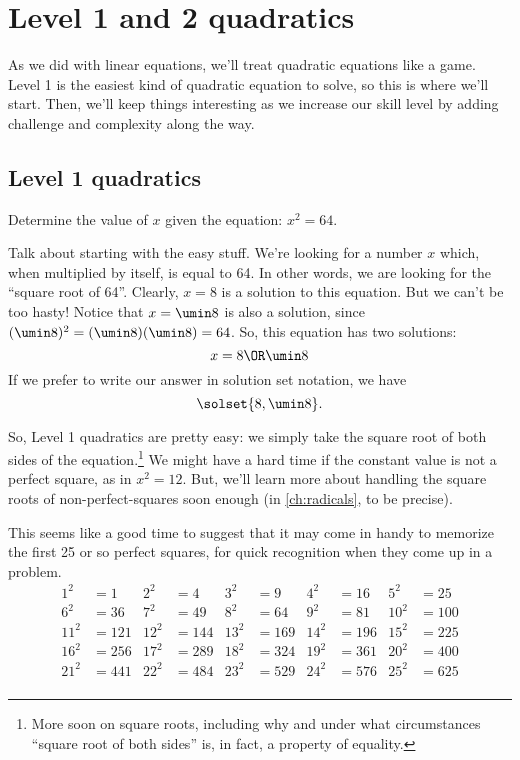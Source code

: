 \section{Level 1 and 2 quadratics}

As we did with linear equations, we'll treat quadratic equations like a game. Level 1 is the easiest kind of quadratic equation to solve, so this is where we'll start. Then, we'll keep things interesting as we increase our skill level by adding challenge and complexity along the way.

\subsection{Level 1 quadratics}

\begin{boxedexplore}
Determine the value of $x$ given the equation: $x^2 = 64$.
\end{boxedexplore} %

Talk about starting with the easy stuff. We're looking for a number $x$ which, when multiplied by itself, is equal to 64. In other words, we are looking for the ``square root of 64''. Clearly, $x=8$ is a solution to this equation. But we can't be too hasty! Notice that $x=\umin8$ is also a solution, since $(\umin8)^2 = (\umin8)(\umin8) = 64$. So, this equation has two solutions:
\[x = 8 \OR \umin8\]
If we prefer to write our answer in solution set notation, we have \[\solset{8,\umin8}.\]

So, Level 1 quadratics are pretty easy: we simply take the square root of both sides of the equation.\footnote{More soon on square roots, including why and under what circumstances ``square root of both sides'' is, in fact, a property of equality.} We might have a hard time if the constant value is not a perfect square, as in $x^2 = 12$. But, we'll learn more about handling the square roots of non-perfect-squares soon enough (in \cref{ch:radicals}, to be precise).

This seems like a good time to suggest that it may come in handy to memorize the first 25 or so perfect squares, for quick recognition when they come up in a problem.
\begin{align*}
1^2 &= 1		&
2^2 &= 4		&
3^2 &= 9		&
4^2 &= 16		&
5^2 &= 25		\\
6^2 &= 36		&
7^2 &= 49		&
8^2 &= 64		&
9^2 &= 81		&
10^2 &= 100	\\
11^2 &= 121	&
12^2 &= 144 	&
13^2 &= 169 	&
14^2 &= 196 	&
15^2 &= 225 	\\
16^2 &= 256 	&
17^2 &= 289 	&
18^2 &= 324 	&
19^2 &= 361 	&
20^2 &= 400 	\\
21^2 &= 441 	&
22^2 &= 484 	&
23^2 &= 529 	&
24^2 &= 576 	&
25^2 &= 625 	\\
\end{align*}

